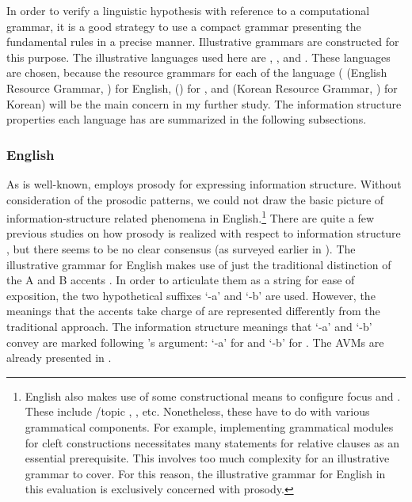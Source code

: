 In order to verify a linguistic hypothesis with reference to a
computational grammar, it is a good strategy
to use a compact grammar presenting the fundamental rules in a precise
manner. Illustrative grammars are constructed for this purpose.  The
illustrative languages used here are , , and
.  These languages are chosen, because the resource
grammars for each of the language ( (English Resource
Grammar, \citealt{flickinger:00}) for English, 
(\citealt{siegel:bender:02}) for , and  (Korean
Resource Grammar, \citealt{kim:etal:11}) for Korean) will be the main
concern in my further study.  The information structure properties
each language has are summarized in the following subsections.



\subsubsection{English}
\label{13:sssec:eng}


As is well-known,  employs prosody for expressing
information structure.  Without consideration of the prosodic
patterns, we could not draw the basic picture of information-structure
related phenomena in English.\footnote{English also makes use of some
  constructional means to configure focus and . These include
  /topic , , etc. Nonetheless, these
  have to do with various grammatical components. For example,
  implementing grammatical modules for cleft constructions
  necessitates many  statements for relative clauses as an
  essential prerequisite. This involves too much
  complexity for an illustrative grammar to cover.  For this reason,
  the illustrative grammar for English in this evaluation is
  exclusively concerned with prosody.} There are quite a few previous
studies on how prosody is realized with respect to information
structure
\citep{jackendoff:72,steedman:00,kadmon:01,buring:03,hedberg:06}, but
there seems to be no clear consensus (as surveyed earlier in
). The illustrative
grammar for English makes use of just the traditional distinction of
the A and B accents \citep{bolinger:58}. In order to articulate them
as a string for ease of exposition, the two hypothetical suffixes `-a'
and `-b' are used. However, the meanings that the accents take charge
of are represented differently from the traditional approach. The
information structure meanings that `-a' and `-b' convey are marked
following \citeauthor{hedberg:06}'s argument: `-a' for
 and `-b' for .
The AVMs are already presented in  .



